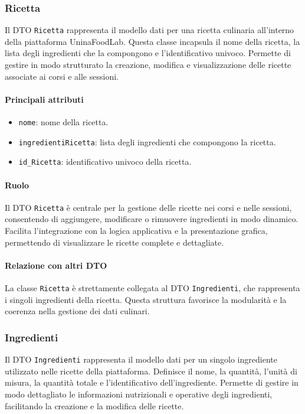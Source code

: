 \subsubsection{Ricetta}
Il DTO \texttt{Ricetta} rappresenta il modello dati per una ricetta culinaria all'interno della piattaforma UninaFoodLab. Questa classe incapsula il nome della ricetta, la lista degli ingredienti che la compongono e l'identificativo univoco. Permette di gestire in modo strutturato la creazione, modifica e visualizzazione delle ricette associate ai corsi e alle sessioni.

\paragraph{Principali attributi}
\begin{itemize}
    \item \texttt{nome}: nome della ricetta.
    \item \texttt{ingredientiRicetta}: lista degli ingredienti che compongono la ricetta.
    \item \texttt{id\_Ricetta}: identificativo univoco della ricetta.
\end{itemize}

\paragraph{Ruolo}
Il DTO \texttt{Ricetta} è centrale per la gestione delle ricette nei corsi e nelle sessioni, consentendo di aggiungere, modificare o rimuovere ingredienti in modo dinamico. Facilita l'integrazione con la logica applicativa e la presentazione grafica, permettendo di visualizzare le ricette complete e dettagliate.

\paragraph{Relazione con altri DTO}
La classe \texttt{Ricetta} è strettamente collegata al DTO \texttt{Ingredienti}, che rappresenta i singoli ingredienti della ricetta. Questa struttura favorisce la modularità e la coerenza nella gestione dei dati culinari.

\subsubsection{Ingredienti}
Il DTO \texttt{Ingredienti} rappresenta il modello dati per un singolo ingrediente utilizzato nelle ricette della piattaforma. Definisce il nome, la quantità, l'unità di misura, la quantità totale e l'identificativo dell'ingrediente. Permette di gestire in modo dettagliato le informazioni nutrizionali e operative degli ingredienti, facilitando la creazione e la modifica delle ricette.

